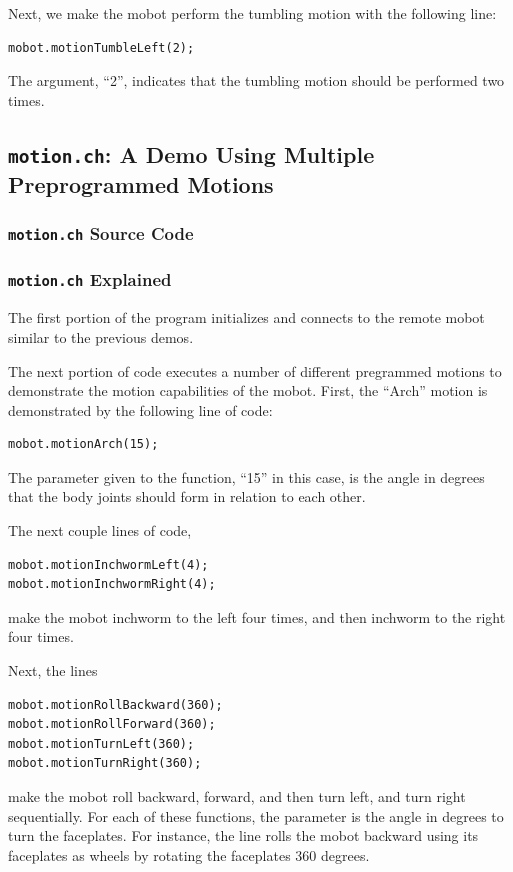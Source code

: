 \documentclass{article}
\begin{document}
Next, we make the mobot perform the tumbling motion with the following line:
\begin{verbatim}
mobot.motionTumbleLeft(2);
\end{verbatim}
The argument, ``2'', indicates that the tumbling motion should be performed
two times.

\subsection{\texttt{motion.ch}: A Demo Using Multiple Preprogrammed Motions}
\subsubsection{\texttt{motion.ch} Source Code}

\subsubsection{\texttt{motion.ch} Explained}
The first portion of the program initializes and connects to the
remote mobot similar to the previous demos.

The next portion of code executes a number of different pregrammed motions
to demonstrate the motion capabilities of the mobot. First, the ``Arch'' motion
is demonstrated by the following line of code:
\begin{verbatim}
mobot.motionArch(15);
\end{verbatim}
The parameter given to the function, ``15'' in this case, is the angle in degrees 
that the body joints should form in relation to each other. 

The next couple lines of code,
\begin{verbatim}
mobot.motionInchwormLeft(4);
mobot.motionInchwormRight(4);
\end{verbatim}
make the mobot inchworm to the left four times, and then inchworm to the right
four times. 

Next, the lines
\begin{verbatim}
mobot.motionRollBackward(360);
mobot.motionRollForward(360);
mobot.motionTurnLeft(360);
mobot.motionTurnRight(360);
\end{verbatim}
make the mobot roll backward, forward, and then turn left, and turn right
sequentially. For each of these functions, the parameter is the angle in degrees
to turn the faceplates. For instance, the line rolls the mobot backward
using its faceplates as wheels by rotating the faceplates 360 degrees.
\end{document}
